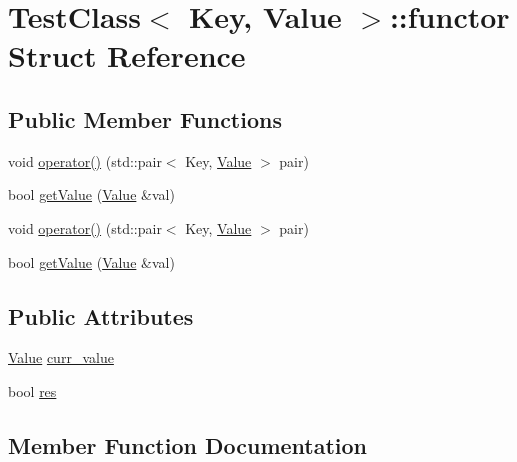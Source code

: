 \hypertarget{struct_test_class_1_1functor}{}\section{Test\+Class$<$ Key, Value $>$\+:\+:functor Struct Reference}
\label{struct_test_class_1_1functor}
\subsection*{Public Member Functions}
\begin{DoxyCompactItemize}
\item 
void \hyperlink{struct_test_class_1_1functor_ac6890291dc692c73faaa31bee690b41e}{operator()} (std\+::pair$<$ Key, \hyperlink{hash__map_2test_object_8h_ad777bf08d8e2b01df17ba5e3c51ae11f}{Value} $>$ pair)
\item 
bool \hyperlink{struct_test_class_1_1functor_aeb074051580e7abcbe0507018d927adb}{get\+Value} (\hyperlink{hash__map_2test_object_8h_ad777bf08d8e2b01df17ba5e3c51ae11f}{Value} \&val)
\item 
void \hyperlink{struct_test_class_1_1functor_ac6890291dc692c73faaa31bee690b41e}{operator()} (std\+::pair$<$ Key, \hyperlink{hash__map_2test_object_8h_ad777bf08d8e2b01df17ba5e3c51ae11f}{Value} $>$ pair)
\item 
bool \hyperlink{struct_test_class_1_1functor_aeb074051580e7abcbe0507018d927adb}{get\+Value} (\hyperlink{hash__map_2test_object_8h_ad777bf08d8e2b01df17ba5e3c51ae11f}{Value} \&val)
\end{DoxyCompactItemize}
\subsection*{Public Attributes}
\begin{DoxyCompactItemize}
\item 
\hyperlink{hash__map_2test_object_8h_ad777bf08d8e2b01df17ba5e3c51ae11f}{Value} \hyperlink{struct_test_class_1_1functor_ae8901ceb7e534ecf91007659aef7ab70}{curr\+\_\+value}
\item 
bool \hyperlink{struct_test_class_1_1functor_aac45799e70b923c7ebd6b1e3aa5ad933}{res}
\end{DoxyCompactItemize}


\subsection{Member Function Documentation}
\hypertarget{struct_test_class_1_1functor_aeb074051580e7abcbe0507018d927adb}{}
